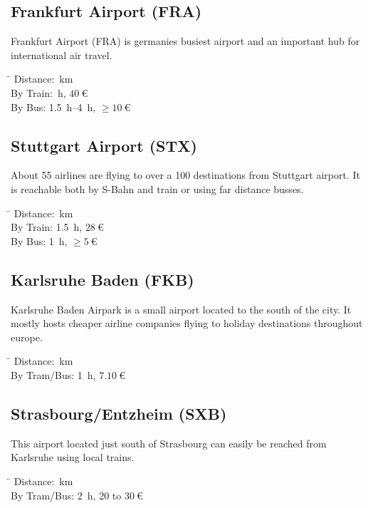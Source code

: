 \begin{multicols}{2}
\raggedcolumns

\subsection{Frankfurt Airport (FRA)}

Frankfurt Airport (FRA) is germanies busiest airport and an important hub for
international air travel.
\begin{tabbing}
\hspace*{2.5cm} \= \kill
Distance: \,km \\
By Train: \,h, $\SI{40}{\euro}$ \\
By Bus:   \> \SI{1.5}{h}–\SI{4}{h}, $\ge\SI{10}{\euro}$
\end{tabbing}

\subsection{Stuttgart Airport (STX)}

About 55 airlines are flying to over a 100 destinations from Stuttgart airport.
It is reachable both by S-Bahn and train or using far distance busses.

\begin{tabbing}
\hspace*{2.5cm} \= \kill
Distance: \,km \\
By Train: \> \SI{1.5}{\hour}, $\SI{28}{\euro}$ \\
By Bus:   \> \SI{1}{\hour}, $\ge\SI{5}{\euro}$
\end{tabbing}

\subsection{Karlsruhe Baden (FKB)}

Karlsruhe Baden Airpark is a small airport located to the south of the city. It
mostly hosts cheaper airline companies flying to holiday destinations
throughout europe.

\begin{tabbing}
\hspace*{2.5cm} \= \kill
Distance: \,km \\
By Tram/Bus: \> \SI{1}{\hour}, $\SI{7.10}{\euro}$ \\
\end{tabbing}

\subsection{Strasbourg/Entzheim (SXB)}

This airport located just south of Strasbourg can easily be reached from Karlsruhe
using local trains.

\begin{tabbing}
\hspace*{2.5cm} \= \kill
Distance: \,km \\
By Tram/Bus: \> \SI{2}{\hour}, 20 to $\SI{30}{\euro}$ \\
\end{tabbing}

\end{multicols}

